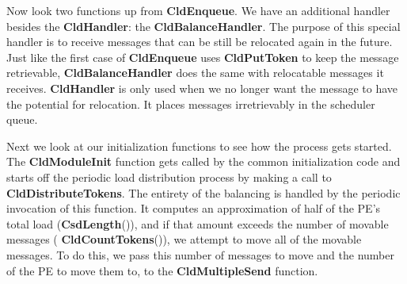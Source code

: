 Now look two functions up from {\bf CldEnqueue}.  We have an additional
handler besides the {\bf CldHandler}: the {\bf CldBalanceHandler}.  The
purpose of this special handler is to receive messages that can be still be
relocated again in the future.  Just like the first case of {\bf CldEnqueue}
uses {\bf CldPutToken} to keep the message retrievable, {\bf
CldBalanceHandler} does the same with relocatable messages it receives.
{\bf CldHandler} is only used when we no
longer want the message to have the potential for relocation.  It
places messages irretrievably in the scheduler queue.

Next we look at our initialization functions to see how the process
gets started.  The {\bf CldModuleInit} function gets called by the
common \converse{} initialization code and starts off the periodic load
distribution process by making a call to {\bf
CldDistributeTokens}. The entirety of the balancing is handled by the
periodic invocation of this function.  It computes an
approximation of half of the PE's total load ({\bf CsdLength}()), and if
that amount exceeds the number of movable messages ({\bf
CldCountTokens}()), we attempt to move all of the movable messages.
To do this, we pass this number of messages to move and the number of
the PE to move them to, to the {\bf CldMultipleSend} function.

